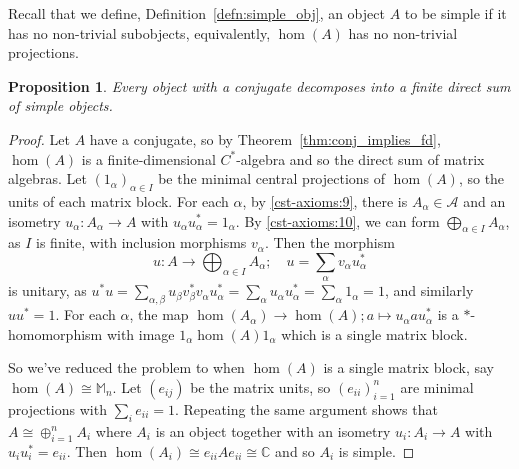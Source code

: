 \documentclass[a4paper,11pt]{article}
\theoremstyle{plain}
\newtheorem{proposition}{Proposition}[section]
\theoremstyle{remark}
\newcommand{\mc}[1]{\mathcal{#1}}
\begin{document}
Recall that we define, Definition~\ref{defn:simple_obj}, an object $A$ to be simple if it has no non-trivial subobjects, equivalently, $\hom(A)$ has no non-trivial projections.

\begin{proposition}
Every object with a conjugate decomposes into a finite direct sum of simple objects.
\end{proposition}
\begin{proof}
Let $A$ have a conjugate, so by Theorem~\ref{thm:conj_implies_fd}, $\hom(A)$ is a finite-dimensional $C^*$-algebra and so the direct sum of matrix algebras.  Let $(1_\alpha)_{\alpha\in I}$ be the minimal central projections of $\hom(A)$, so the units of each matrix block.  For each $\alpha$, by \ref{cst-axioms:9}, there is $A_\alpha\in\mc A$ and an isometry $u_\alpha \colon A_\alpha \to A$ with $u_\alpha u_\alpha^* = 1_\alpha$.  By \ref{cst-axioms:10}, we can form $\bigoplus_{\alpha\in I} A_\alpha$, as $I$ is finite, with inclusion morphisms $v_\alpha$.  Then the morphism
\[ u \colon A \to \bigoplus_{\alpha\in I} A_\alpha; \quad u =\sum_\alpha v_\alpha u_\alpha^* \]
is unitary, as $u^*u = \sum_{\alpha,\beta} u_\beta v_\beta^* v_\alpha u_\alpha^* = \sum_\alpha u_\alpha u_\alpha^* = \sum_\alpha 1_\alpha = 1$, and similarly $uu^*=1$.  For each $\alpha$, the map $\hom(A_\alpha) \to \hom(A); a \mapsto u_\alpha a u_\alpha^*$ is a $*$-homomorphism with image $1_\alpha \hom(A) 1_\alpha$ which is a single matrix block.

So we've reduced the problem to when $\hom(A)$ is a single matrix block, say $\hom(A) \cong \mathbb M_n$.  Let $(e_{ij})$ be the matrix units, so $(e_{ii})_{i=1}^n$ are minimal projections with $\sum_i e_{ii} = 1$.  Repeating the same argument shows that $A \cong \oplus_{i=1}^n A_i$ where $A_i$ is an object together with an isometry $u_i \colon A_i \to A$ with $u_i u_i^* = e_{ii}$.  Then $\hom(A_i) \cong e_{ii} A e_{ii} \cong \mathbb C$ and so $A_i$ is simple.
\end{proof}
\end{document}
